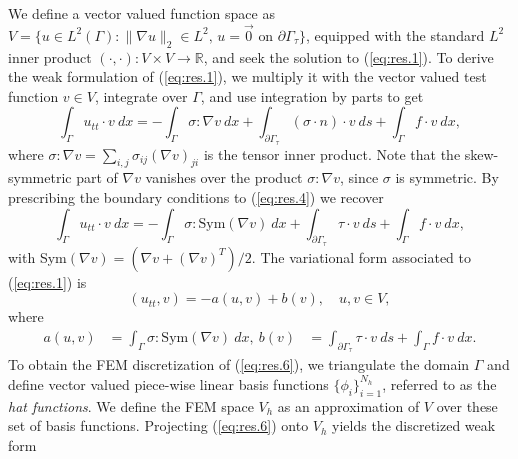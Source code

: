 We define a vector valued function space as $V = \{ u \in L^2(\Gamma) : \| \nabla u \|_2 \in L^2 \text{, } u = \vec 0 \text{ on } \partial \Gamma_\tau \}$, equipped with the standard $L^2$ inner product $(\cdot,\cdot):V\times V \to \mathbb R$, and seek the solution to (\ref{eq:res.1}). To derive the weak formulation of (\ref{eq:res.1}), we multiply it with the vector valued test function $v \in V$, integrate over $\Gamma$, and use integration by parts to get 
\begin{equation}  \label{eq:res.4}
	\int_{\Gamma} u_{tt} \cdot v\ dx = - \int_{\Gamma} \sigma : \nabla v \ dx+ \int_{\partial \Gamma_\tau} (\sigma \cdot n) \cdot v\ ds +  \int_{\Gamma} f \cdot v \ dx,
\end{equation}
where $\sigma : \nabla v = \sum_{i,j}\sigma_{ij}(\nabla v)_{ji}$ is the tensor inner product. Note that the skew-symmetric part of $\nabla v$ vanishes over the product $\sigma : \nabla v$, since $\sigma$ is symmetric. By prescribing the boundary conditions to (\ref{eq:res.4}) we recover
\begin{equation} \label{eq:res.5}
	\int_{\Gamma} u_{tt} \cdot v\ dx = - \int_{\Gamma} \sigma : \text{Sym}(\nabla v) \ dx+ \int_{\partial \Gamma_\tau} \tau \cdot v\ ds +  \int_{\Gamma} f \cdot v \ dx,
\end{equation}
with Sym$(\nabla v) = (\nabla v + (\nabla v)^T)/2$. The variational form associated to (\ref{eq:res.1}) is
\begin{equation} \label{eq:res.6}
	(u_{tt},v) = - a(u,v) + b(v), \quad u,v\in V,
\end{equation}
where
\begin{equation} \label{eq:res.7}
\begin{aligned}
	a(u,v) &= \int_{\Gamma} \sigma : \text{Sym}(\nabla v) \ dx, ~
	b(v) &= \int_{\partial \Gamma_\tau} \tau \cdot v\ ds +  \int_{\Gamma} f \cdot v \ dx.
\end{aligned}
\end{equation}
To obtain the FEM discretization of (\ref{eq:res.6}), we triangulate the domain $\Gamma$ and define vector valued piece-wise linear basis functions $\{\phi_i\}_{i=1}^{N_h}$, referred to as the \emph{hat functions}. We define the FEM space $V_h$ as an approximation of $V$ over these set of basis functions. Projecting (\ref{eq:res.6}) onto $V_h$ yields the discretized weak form
